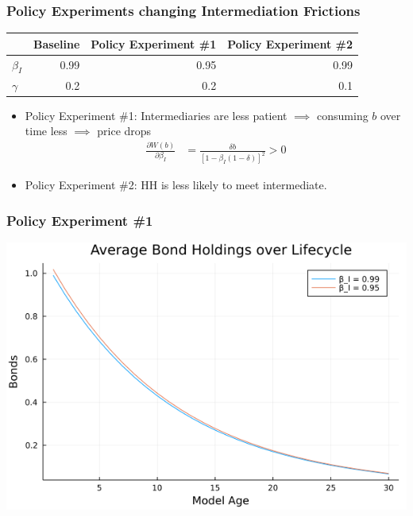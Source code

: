\documentclass[handout]{beamer}
\begin{document}
\begin{frame}
\frametitle{Policy Experiments changing Intermediation Frictions}

\begin{center}
\begin{tabular}{ l | r r r }
& Baseline & Policy Experiment \#1 & Policy Experiment \#2\\ 
\hline 
$\beta_I$ & 0.99 & 0.95 & 0.99 \\
$\gamma$  & 0.2 & 0.2 & 0.1 \\ 
\end{tabular}
\end{center}

\bigskip


\begin{itemize}[<+->]
\item Policy Experiment \#1: Intermediaries are less patient $\implies$ consuming $b$ over time less $\implies$ price drops
\begin{align*}
\frac{\partial W(b)}{\partial \beta_I} &= \frac{\delta b }{[1 - \beta_I (1-\delta)]^2} > 0
\end{align*}
\bigskip
\item Policy Experiment \#2: HH is less likely to meet intermediate.
\end{itemize}


\end{frame}





\begin{frame}
\frametitle{Policy Experiment \#1}

\begin{center}
\includegraphics[scale = 0.5]{bond}
\end{center}

\end{frame}
\end{document}
